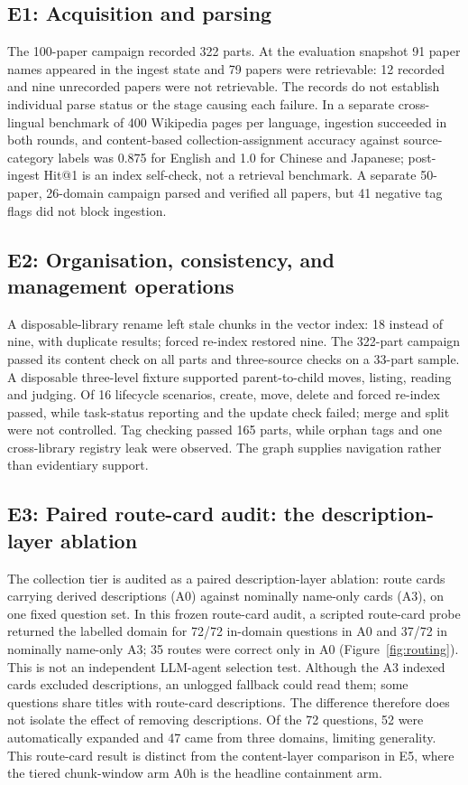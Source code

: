 \subsection{E1: Acquisition and parsing}
\label{sec:e1}
The 100-paper campaign recorded 322 parts. At the evaluation snapshot 91
paper names appeared in the ingest state and 79 papers were retrievable:
12 recorded and nine unrecorded papers were not retrievable. The records do
not establish individual parse status or the stage causing each failure. In
a separate cross-lingual benchmark of 400 Wikipedia pages per language,
ingestion succeeded in both rounds, and content-based collection-assignment
accuracy against source-category labels was 0.875 for English and 1.0 for
Chinese and Japanese; post-ingest Hit@1 is an index self-check, not a retrieval
benchmark. A separate 50-paper, 26-domain campaign parsed and verified all
papers, but 41 negative tag flags did not block ingestion.

\subsection{E2: Organisation, consistency, and management operations}
\label{sec:e2}
A disposable-library rename left stale chunks in the vector index: 18 instead
of nine, with duplicate results; forced re-index restored nine. The 322-part
campaign passed its content check on all parts and three-source checks on a
33-part sample. A disposable three-level fixture supported parent-to-child
moves, listing, reading and judging. Of 16 lifecycle scenarios, create, move,
delete and forced re-index passed, while task-status reporting and the update
check failed; merge and split were not controlled. Tag checking passed 165
parts, while orphan tags and one cross-library registry leak were observed.
The graph supplies navigation rather than evidentiary support.

\subsection{E3: Paired route-card audit: the description-layer ablation}
\label{sec:routing-audit}
The collection tier is audited as a paired description-layer ablation: route
cards carrying derived descriptions (A0) against nominally name-only cards
(A3), on one fixed question set. In this frozen route-card audit, a scripted
route-card probe returned the labelled domain for 72/72 in-domain questions in
A0 and 37/72 in nominally name-only A3; 35 routes were correct only in A0
(Figure~\ref{fig:routing}). This is not an independent LLM-agent selection
test. Although the A3 indexed cards excluded descriptions, an unlogged fallback
could read them; some questions share titles with route-card descriptions. The
difference therefore does not isolate the effect of removing descriptions. Of
the 72 questions, 52 were automatically expanded and 47 came from three
domains, limiting generality. This route-card result is distinct from the
content-layer comparison in E5, where the tiered chunk-window arm A0h is the
headline containment arm.

